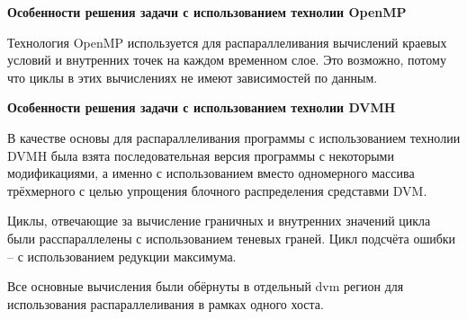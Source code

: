 \textbf{Особенности решения задачи с использованием технолии OpenMP}

Технология OpenMP используется для распараллеливания вычислений краевых условий и внутренних точек на каждом временном слое.
Это возможно, потому что циклы в этих вычислениях не имеют зависимостей по данным. 

\textbf{Особенности решения задачи с использованием технолии DVMH}

В качестве основы для распараллеливания программы с использованием технолии DVMH была взята последовательная версия программы с некоторыми модификациями, а именно с использованием вместо одномерного массива трёхмерного с целью упрощения блочного распределения средставми DVM.

Циклы, отвечающие за вычисление граничных и внутренних значений цикла были расспараллелены с использованием теневых граней.
Цикл подсчёта ошибки -- с использованием редукции максимума.

Все основные вычисления были обёрнуты в отдельный dvm регион для использования распараллеливания в рамках одного хоста.